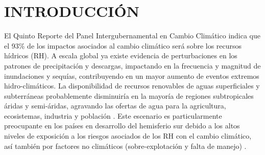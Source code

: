 \documentclass[12pt]{article}
\begin{document}
	

\clearpage

\tableofcontents
\clearpage
\listoffigures
\clearpage
\listoftables
\clearpage
\listofappendices
\clearpage



\clearpage
\vspace*{0.5mm}
\section{INTRODUCCIÓN}


El Quinto Reporte del Panel Intergubernamental en Cambio Climático \citep{Field2014} indica que el 93\% de los impactos asociados al cambio climático será sobre los recursos hídricos (RH). A escala global ya existe evidencia de perturbaciones en los patrones de precipitación y descargas, impactando en la frecuencia y magnitud de inundaciones y sequías, contribuyendo en un mayor aumento de eventos extremos hidro-climáticos. La disponibilidad de recursos renovables de aguas superficiales y subterráneas probablemente disminuiría en la mayoría de regiones subtropicales áridas y semi-áridas, agravando las ofertas de agua para la agricultura, ecosistemas, industria y población \citep{Field2014}. Este escenario es particularmente preocupante en los países en desarrollo del hemisferio sur \citep{Satterthwaite2012} debido a los altos niveles de exposición a los riesgos asociados de los RH con el cambio climático, así también por factores no climáticos (sobre-explotación y falta de manejo) \citep{MacAlister2018}.
\end{document}
